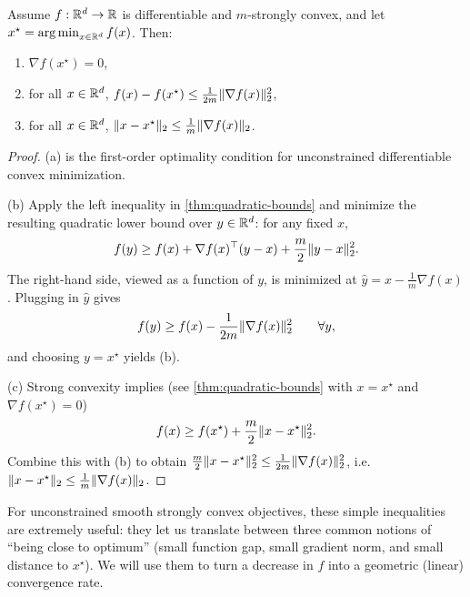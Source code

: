 \begin{corollary}
\label{cor:sc-links}
Assume $f:\mathbb{R}^d\to\mathbb{R}$ is differentiable and $m$-strongly convex, and let $x^\star = \operatorname*{arg\,min}_{x\in\mathbb{R}^d} f(x)$.
Then:
\begin{enumerate}[leftmargin=*,label=(\alph*)]
  \item $\nabla f(x^\star)=0$,
  \item for all $x \in \mathbb{R}^d$, $f(x) - f(x^\star) \le \frac{1}{2m}\lVert\nabla f(x)\rVert_2^2$,
  \item for all $x \in \mathbb{R}^d$, $\lVert x-x^\star\rVert_2 \le \frac{1}{m}\lVert\nabla f(x)\rVert_2$.
\end{enumerate}
\end{corollary}
\begin{proof}
(a) is the first-order optimality condition for unconstrained differentiable convex minimization.

(b) Apply the left inequality in \cref{thm:quadratic-bounds} and minimize the resulting quadratic lower bound over $y\in\mathbb{R}^d$:
for any fixed $x$,
\[
f(y) \ge f(x) + \nabla f(x)^\top (y-x) + \frac{m}{2}\lVert y-x\rVert_2^2.
\]
The right-hand side, viewed as a function of $y$, is minimized at $\hat y = x - \frac{1}{m}\nabla f(x)$.
Plugging in $\hat y$ gives
\[
f(y) \ge f(x) - \frac{1}{2m}\lVert\nabla f(x)\rVert_2^2 \qquad \forall y,
\]
and choosing $y=x^\star$ yields (b).

(c) Strong convexity implies (see \cref{thm:quadratic-bounds} with $x=x^\star$ and $\nabla f(x^\star)=0$)
\[
f(x) \ge f(x^\star) + \frac{m}{2}\lVert x-x^\star\rVert_2^2.
\]
Combine this with (b) to obtain $\frac{m}{2}\lVert x-x^\star\rVert_2^2 \le \frac{1}{2m}\lVert\nabla f(x)\rVert_2^2$, i.e. $\lVert x-x^\star\rVert_2 \le \frac{1}{m}\lVert\nabla f(x)\rVert_2$.
\end{proof}
For unconstrained smooth strongly convex objectives, these simple inequalities are extremely useful: they let us translate between three common notions of ``being close to optimum'' (small function gap, small gradient norm, and small distance to $x^\star$).
We will use them to turn a decrease in $f$ into a geometric (linear) convergence rate.
